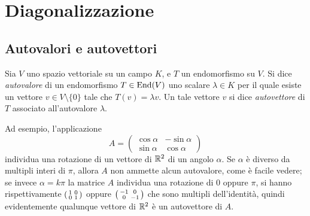 \chapter{Diagonalizzazione}
\section{Autovalori e autovettori}
\begin{definizione}\label{d:autovalore}
	Sia $V$ uno spazio vettoriale su un campo $K$, e $T$ un endomorfismo su $V$.
	Si dice \emph{autovalore} di un endomorfismo $T\in\operatorname{End}(V)$ uno scalare $\lambda\in K$ per il quale esiste un vettore $v\in V\setminus\{0\}$ tale che $T(v)=\lambda v$.
	Un tale vettore $v$ si dice \emph{autovettore} di $T$ associato all'autovalore $\lambda$.
\end{definizione}
Ad esempio, l'applicazione
\begin{equation*}
	A=\begin{pmatrix}\cos\alpha&-\sin\alpha\\\sin\alpha&\cos\alpha\end{pmatrix}
\end{equation*}
individua una rotazione di un vettore di $\mathbb{R}^2$ di un angolo $\alpha$.
Se $\alpha$ è diverso da multipli interi di $\pi$, allora $A$ non ammette alcun autovalore, come è facile vedere; se invece $\alpha=k\pi$ la matrice $A$ individua una rotazione di 0 oppure $\pi$, si hanno rispettivamente $\begin{psmallmatrix}1&0\\0&1\end{psmallmatrix}$ oppure $\begin{psmallmatrix}-1&0\\0&-1\end{psmallmatrix}$ che sono multipli dell'identità, quindi evidentemente qualunque vettore di $\mathbb{R}^2$ è un autovettore di $A$.

